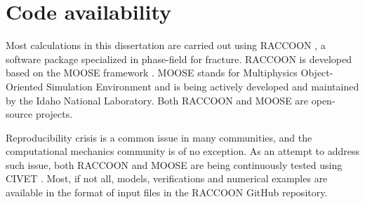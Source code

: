 \chapter{Code availability}
\label{appendix: code}

Most calculations in this dissertation are carried out using RACCOON \cite{raccoon,raccoon_doc}, a software package specialized in phase-field for fracture. RACCOON is developed based on the MOOSE framework \cite{moose_inl}. MOOSE stands for Multiphysics Object-Oriented Simulation Environment and is being actively developed and maintained by the Idaho National Laboratory. Both RACCOON and MOOSE are open-source projects.

Reproducibility crisis is a common issue in many communities, and the computational mechanics community is of no exception. As an attempt to address such issue, both RACCOON and MOOSE are being continuously tested using CIVET \cite{slaughter2021continuous}. Most, if not all, models, verifications and numerical examples are available in the format of input files in the RACCOON GitHub repository.
